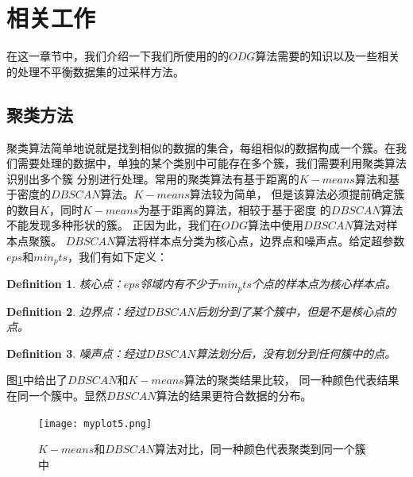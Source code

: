 \documentclass{article}
\newtheorem{definition}{Definition}
\begin{document}
\section{相关工作}
在这一章节中，我们介绍一下我们所使用的的$ODG$算法需要的知识以及一些相关的处理不平衡数据集的过采样方法。
\subsection{聚类方法}
聚类算法简单地说就是找到相似的数据的集合，每组相似的数据构成一个簇。在我们需要处理的数据中，单独的某个类别中可能存在多个簇，我们需要利用聚类算法识别出多个簇
分别进行处理。常用的聚类算法有基于距离的$K-means$算法和基于密度的$DBSCAN$算法。$K-means$算法较为简单，
但是该算法必须提前确定簇的数目$K$，同时$K-means$为基于距离的算法，相较于基于密度
的$DBSCAN$算法不能发现多种形状的簇。
正因为此，我们在$ODG$算法中使用$DBSCAN$算法对样本点聚簇。
$DBSCAN$算法将样本点分类为核心点，边界点和噪声点。给定超参数$eps$和$min_pts$，我们有如下定义：
\begin{definition}
  核心点：$eps$邻域内有不少于$min_pts$个点的样本点为核心样本点。
\end{definition}
\begin{definition}
  边界点：经过$DBSCAN$后划分到了某个簇中，但是不是核心点的点。
\end{definition}
\begin{definition}
  噪声点：经过$DBSCAN$算法划分后，没有划分到任何簇中的点。
\end{definition}
图\ref{fig5}中给出了$DBSCAN$和$K-means$算法的聚类结果比较，
同一种颜色代表结果在同一个簇中。显然$DBSCAN$算法的结果更符合数据的分布。
\begin{figure}
  \centering
  \texttt{[image: myplot5.png]}
  \caption{$K-means$和$DBSCAN$算法对比，同一种颜色代表聚类到同一个簇中}
  \label{fig5}
\end{figure}
\end{document}
